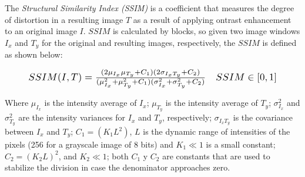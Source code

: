 \documentclass[spanish,twocolumn]{article}
\begin{document}
The {\it Structural Similarity Index (SSIM)} \cite{wang2004image} is a coefficient that measures the degree of distortion in a resulting image $T$ as a result of applying ontrast enhancement to an original image $I$. $SSIM$ is calculated by blocks, so given two image windows $I_x$ and $T_y$ for the original and resulting images, respectively, the $SSIM$ is defined as shown below:

\begin{equation}\label{eq:ssim}
\resizebox{.9\hsize}{!}
{
$SSIM(I,T)=\frac{(2\mu_{I_x}\mu_{T_y}+C_1)(2\sigma_{I_xT_y}+C_2)}{(\mu_{I_x}^2+\mu_{T_y}^2+C_1)(\sigma_{I_x}^2+\sigma_{T_y}^2+C_2)} \quad SSIM \in [0,1]$
}
\end{equation}

Where $\mu_{I_x}$ is the intensity average of $I_x$; $\mu_{T_y}$ is the intensity average of $T_y$; $\sigma_{I_x}^2$ and $\sigma_{T_y}^2$ are the intensity variances for $I_x$ and $T_y$, respectively; $\sigma_{I_x T_y}$ is the covariance between $I_x$ and $T_y$; $C_1=(K_1L^2)$, $L$ is the dynamic range of intensities of the pixels (256 for a grayscale image of 8 bits) and $K_1 \ll 1$ is a small constant; $C_2=(K_2 L)^2$, and $K_2 \ll 1$; both $C_1$ y $C_2$ are constants that are used to stabilize the division in case the denominator approaches zero.
\end{document}

